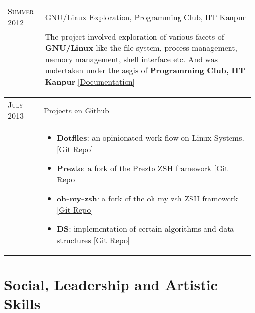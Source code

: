 \documentclass[a4paper,10pt]{article} %
\newcommand{\project}[3]{
    \begin{tabular}{>{\raggedleft}p{2.2cm}|p{15cm}}
        \textsc{#1} & #2 \\
                    & \footnotesize{#3} \\
    \end{tabular}
}
\begin{document}
\project {Summer 2012}
         {GNU/Linux Exploration, Programming Club, IIT Kanpur}
         {The project involved exploration of various facets of
          \textbf{GNU/Linux} like the file system, process management,
          memory management, shell interface etc. And was
          undertaken under the aegis of \textbf{Programming Club, IIT Kanpur}
          \href{https://docs.google.com/document/d/1ZHO9w36aoq3oaZBR4Um1AOmDfiTDAEgM6baQAu3icw4/edit?usp=sharing}
          {[Documentation]} }

\project {July 2013}
         {Projects on Github}
         {
             \begin{itemize}[leftmargin=*]
                 \item \textbf{Dotfiles}: an opinionated work flow on Linux Systems.
                     \href{https://github.com/srijanshetty/dotfiles} {[Git Repo]}
                 \item \textbf{Prezto}: a fork of the Prezto ZSH framework
                     \href{https://github.com/srijanshetty/prezto} {[Git Repo]}
                 \item \textbf{oh-my-zsh}: a fork of the oh-my-zsh ZSH framework
                     \href{https://github.com/srijanshetty/oh-my-zsh} {[Git Repo]}
                 \item \textbf{DS}: implementation of certain algorithms and data structures
                     \href{https://github.com/srijanshetty/DS} {[Git Repo]}
             \end{itemize}
         }


\section {Social, Leadership and Artistic Skills}
\end{document}
